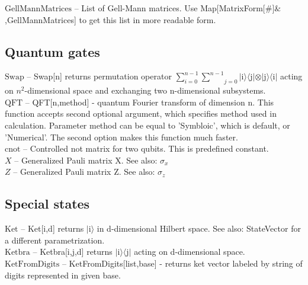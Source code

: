 \noindent\textbf{$ \text{GellMannMatrices} $ }-- List of Gell-Mann matrices. Use Map[MatrixForm[$\#$]$\&$,GellMannMatrices] to get this list in more readable form.$  $\\

\subsection{Quantum gates}

\noindent\textbf{$ \text{Swap} $ }-- Swap[n] returns permutation operator $ \sum _{i=0}^{n-1} \underset{j=0}{\overset{n-1}{ \sum }} $$|$i$\rangle \langle $j$|\otimes |$j$\rangle \langle $i$|$ acting on $ n^2 $-dimensional space and exchanging two n-dimensional subsystems.$  $\\

\noindent\textbf{$ \text{QFT} $ }-- QFT[n,method] - quantum Fourier transform of dimension n. This function accepts second optional argument, which specifies method used in calculation. Parameter method can be equal to 'Symbloic', which is default, or 'Numerical'. The second option makes this function much faster.$  $\\

\noindent\textbf{$ \text{cnot} $ }-- Controlled not matrix for two qubits. This is predefined constant.$  $\\

\noindent\textbf{$ X $ }-- Generalized Pauli matrix X. See also: $ \sigma _x $\\

\noindent\textbf{$ Z $ }-- Generalized Pauli matrix Z. See also: $ \sigma _z $\\

\subsection{Special states}

\noindent\textbf{$ \text{Ket} $ }-- Ket[i,d] returns $|$i$\rangle $ in d-dimensional Hilbert space. See also: StateVector for a different parametrization.$  $\\

\noindent\textbf{$ \text{Ketbra} $ }-- Ketbra[i,j,d] returns $|$i$\rangle \langle $j$|$ acting on d-dimensional space.$  $\\

\noindent\textbf{$ \text{KetFromDigits} $ }-- KetFromDigits[list,base] - returns ket vector labeled by string of digits represented in given base.$  $\\

